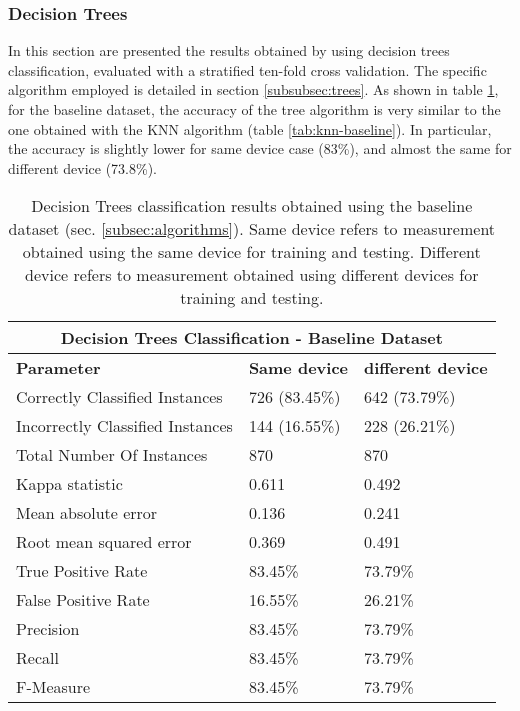 \subsubsection{Decision Trees}
\label{test-trees}
In this section are presented the results obtained by using decision trees classification, evaluated with a stratified ten-fold cross validation. The specific algorithm employed is detailed in section \ref{subsubsec:trees}. As shown in table \ref{tab:tree-baseline}, for the baseline dataset, the accuracy of the tree algorithm is very similar to the one obtained with the KNN algorithm (table \ref{tab:knn-baseline}). In particular, the accuracy is slightly lower for same device case (83\%), and almost the same for different device (73.8\%).


\begin{table}
\center
\caption[Decision Trees classification results obtained using the baseline dataset.]{Decision Trees classification results obtained using the baseline dataset (sec. \ref{subsec:algorithms}). Same device refers to measurement obtained using the same device for training and testing. Different device refers to measurement obtained using different devices for training and testing.}
\label{tab:tree-baseline}
\begin{tabular}{ |l|l|l| }
  \hline
  \multicolumn{3}{|c|}{\textbf{Decision Trees Classification - Baseline Dataset}} \\
  \hline
  \textbf{Parameter} & \textbf{Same device} & \textbf{different device}\\
  \hline
  Correctly Classified Instances & 726 (83.45\%) & 642 (73.79\%) \\
  Incorrectly Classified Instances & 144 (16.55\%) & 228 (26.21\%) \\
  Total Number Of Instances & 870 & 870 \\
  Kappa statistic & 0.611 & 0.492 \\
  Mean absolute error & 0.136 & 0.241 \\
  Root mean squared error & 0.369 & 0.491 \\
  True Positive Rate & 83.45\% & 73.79\% \\
  False Positive Rate & 16.55\% & 26.21\% \\
  Precision & 83.45\% & 73.79\% \\
  Recall & 83.45\% & 73.79\% \\
  F-Measure & 83.45\% & 73.79\% \\
  \hline
\end{tabular}
\end{table}

